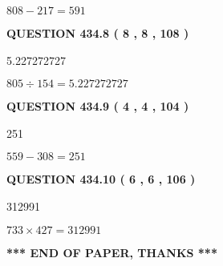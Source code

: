 \documentclass{ctexart}
\begin{document}
$ %
808 -  %
217=   %
591$
 
 
  
\vspace{0.2in}
  
{\textbf{\Large{QUESTION
434.8 
 ( 8 , 8 , 108 )
}}}
  
  
 
 
\noindent{}

5.227272727
 
 
 
 
\noindent{}

$ %
805 \div  %
154=   %
5.227272727$
 
 
  
\vspace{0.2in}
  
{\textbf{\Large{QUESTION
434.9 
 ( 4 , 4 , 104 )
}}}
  
  
 
 
\noindent{}

251
 
 
 
 
\noindent{}

$ %
559 -  %
308=   %
251$
 
 
  
\vspace{0.2in}
  
{\textbf{\Large{QUESTION
434.10 
 ( 6 , 6 , 106 )
}}}
  
  
 
 
\noindent{}

312991
 
 
 
 
\noindent{}

$ %
733 \times  %
427=   %
312991$
 
 
   
   
 \vspace{0.2in}
 
   
   
   
   
\vspace{1.0in} 
{\textbf{\large{ *** END OF PAPER, THANKS *** }}} 
   
\end{document}
